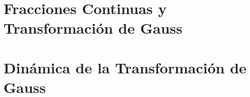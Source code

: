 \documentclass[12pt]{report}
\begin{document}
\renewcommand{\thepage}{\arabic{page}}
\setcounter{page}{1}

\chapter{Fracciones Continuas y Transformación de Gauss}
    
    
\chapter{Dinámica de la Transformación de Gauss}
    
    

\newpage


\renewcommand*{\bibname}{BIBLIOGRAFÍA}

\end{document}
